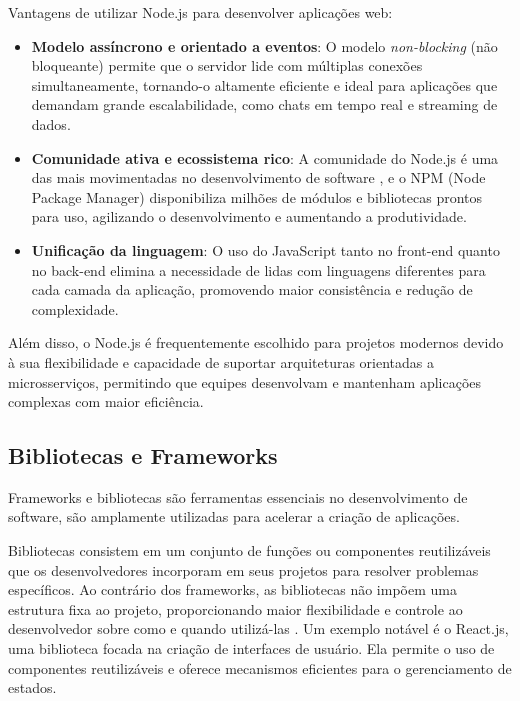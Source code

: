 Vantagens de utilizar Node.js para desenvolver aplicações web:

\begin{itemize}
    \item \textbf{Modelo assíncrono e orientado a eventos}: O modelo \emph{non-blocking} (não bloqueante) permite que o servidor lide com múltiplas conexões simultaneamente, tornando-o altamente eficiente e ideal para aplicações que demandam grande escalabilidade, como chats em tempo real e streaming de dados.
    \item \textbf{Comunidade ativa e ecossistema rico}: A comunidade do Node.js é uma das mais movimentadas no desenvolvimento de software \cite{size-programming-languages}, e o NPM (Node Package Manager) disponibiliza milhões de módulos e bibliotecas prontos para uso, agilizando o desenvolvimento e aumentando a produtividade.
    \item \textbf{Unificação da linguagem}: O uso do JavaScript tanto no front-end quanto no back-end elimina a necessidade de lidas com linguagens diferentes para cada camada da aplicação, promovendo maior consistência e redução de complexidade.
\end{itemize}

Além disso, o Node.js é frequentemente escolhido para projetos modernos devido à sua flexibilidade e capacidade de suportar arquiteturas orientadas a microsserviços, permitindo que equipes desenvolvam e mantenham aplicações complexas com maior eficiência.

\subsection{Bibliotecas e Frameworks}


Frameworks e bibliotecas são ferramentas essenciais no desenvolvimento de software, são amplamente utilizadas para acelerar a criação de aplicações.

Bibliotecas consistem em um conjunto de funções ou componentes reutilizáveis que os desenvolvedores incorporam em seus projetos para resolver problemas específicos. Ao contrário dos frameworks, as bibliotecas não impõem uma estrutura fixa ao projeto, proporcionando maior flexibilidade e controle ao desenvolvedor sobre como e quando utilizá-las \cite{libs-vs-frameworks}. Um exemplo notável é o React.js, uma biblioteca focada na criação de interfaces de usuário. Ela permite o uso de componentes reutilizáveis e oferece mecanismos eficientes para o gerenciamento de estados.

